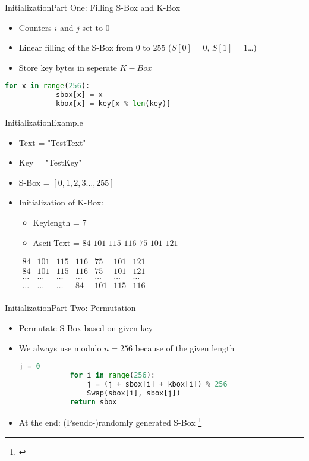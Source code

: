 \documentclass[
	aspectratio=169,	%
	onlytextwidth,		%
	t					%
	]{beamer}
\begin{document}
\begin{frame}[fragile]{Initialization}{Part One: Filling S-Box and K-Box}
	\begin{itemize}
		\item Counters $i$ and $j$ set to $0$
		\item Linear filling of the S-Box from $0$ to $255$ ($S[0] = 0$, $S[1] = 1$\dots)
		\item Store key bytes in seperate $K-Box$
	\end{itemize}
	\begin{lstlisting}[language=Python]
		for x in range(256):
			sbox[x] = x
			kbox[x] = key[x % len(key)]
	\end{lstlisting}
\end{frame}


\begin{frame}{Initialization}{Example}
	\begin{itemize}
		\item Text = "TestText"
		\item Key = "TestKey"
		\item S-Box = $[0, 1, 2, 3 \dots, 255]$
		\item Initialization of K-Box:
		\begin{itemize}
			\item Keylength = 7
			\item Ascii-Text = $84$ $101$ $115$ $116$ $75$ $101$ $121$
		\end{itemize}
		\medskip
		$\begin{array}{|ccccccc|}
		84 & 101 & 115 & 116 & 75 & 101 & 121 \\
		84 & 101 & 115 & 116 & 75 & 101 & 121 \\
		\dots & \dots & \dots & \dots & \dots & \dots & \dots \\
		\dots & \dots & \dots & 84 & 101 & 115 & 116 \\
		\end{array}$
	\end{itemize}
\end{frame}


\begin{frame}[fragile]{Initialization}{Part Two: Permutation}
	\begin{itemize}[<+->]
		\item Permutate S-Box based on given key
		\item We always use modulo $n = 256$ because of the given length
		\begin{lstlisting}[language=Python]
			j = 0
			for i in range(256):
				j = (j + sbox[i] + kbox[i]) % 256
				Swap(sbox[i], sbox[j])
			return sbox
		\end{lstlisting}
		\item At the end: (Pseudo-)randomly generated S-Box \footnote[frame]{\cite{woungang20192nd}}
	\end{itemize}
\end{frame}
\end{document}
